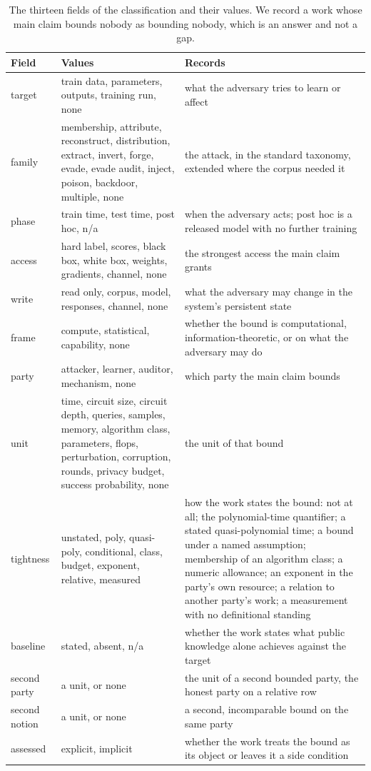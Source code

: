 \begin{table}[t]
\centering
\small
\caption{The thirteen fields of the classification and their values. We record a
work whose main claim bounds nobody as bounding nobody, which is an answer and
not a gap.}
\label{tab:fields}
\begin{tabular}{@{}lp{6.4cm}p{9.0cm}@{}}
\toprule
Field & Values & Records \\
\midrule
target & train data, parameters, outputs, training run, none & what the adversary tries to learn or affect \\
family & membership, attribute, reconstruct, distribution, extract, invert, forge, evade, evade audit, inject, poison, backdoor, multiple, none & the attack, in the standard taxonomy, extended where the corpus needed it \\
phase & train time, test time, post hoc, n/a & when the adversary acts; post hoc is a released model with no further training \\
access & hard label, scores, black box, white box, weights, gradients, channel, none & the strongest access the main claim grants \\
write & read only, corpus, model, responses, channel, none & what the adversary may change in the system's persistent state \\
frame & compute, statistical, capability, none & whether the bound is computational, information-theoretic, or on what the adversary may do \\
\midrule
party & attacker, learner, auditor, mechanism, none & which party the main claim bounds \\
unit & time, circuit size, circuit depth, queries, samples, memory, algorithm class, parameters, flops, perturbation, corruption, rounds, privacy budget, success probability, none & the unit of that bound \\
tightness & unstated, poly, quasi-poly, conditional, class, budget, exponent, relative, measured & how the work states the bound: not at all; the polynomial-time quantifier; a stated quasi-polynomial time; a bound under a named assumption; membership of an algorithm class; a numeric allowance; an exponent in the party's own resource; a relation to another party's work; a measurement with no definitional standing \\
baseline & stated, absent, n/a & whether the work states what public knowledge alone achieves against the target \\
second party & a unit, or none & the unit of a second bounded party, the honest party on a relative row \\
second notion & a unit, or none & a second, incomparable bound on the same party \\
assessed & explicit, implicit & whether the work treats the bound as its object or leaves it a side condition \\
\bottomrule
\end{tabular}
\end{table}

